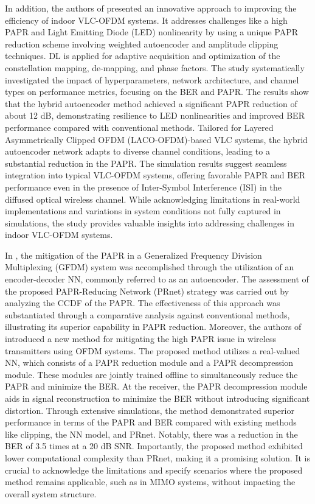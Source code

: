\documentclass[conference]{IEEEtran}
\begin{document}
In addition, the authors of \cite{b143} presented an innovative approach to improving the efficiency of indoor VLC-OFDM systems. It addresses challenges like a high PAPR and Light Emitting Diode (LED) nonlinearity by using a unique PAPR reduction scheme involving weighted autoencoder and amplitude clipping techniques. DL is applied for adaptive acquisition and optimization of the constellation mapping, de-mapping, and phase factors. The study systematically investigated the impact of hyperparameters, network architecture, and channel types on performance metrics, focusing on the BER and PAPR. The results show that the hybrid autoencoder method achieved a significant PAPR reduction of about 12 dB, demonstrating resilience to LED nonlinearities and improved BER performance compared with conventional methods. Tailored for Layered Asymmetrically Clipped OFDM (LACO-OFDM)-based VLC systems, the hybrid autoencoder network adapts to diverse channel conditions, leading to a substantial reduction in the PAPR. The simulation results suggest seamless integration into typical VLC-OFDM systems, offering favorable PAPR and BER performance even in the presence of Inter-Symbol Interference (ISI) in the diffused optical wireless channel. While acknowledging limitations in real-world implementations and variations in system conditions not fully captured in simulations, the study provides valuable insights into addressing challenges in indoor VLC-OFDM systems.

In \cite{b144}, the mitigation of the PAPR in a Generalized Frequency Division Multiplexing (GFDM) system was accomplished through the utilization of an encoder-decoder NN, commonly referred to as an autoencoder. The assessment of the proposed PAPR-Reducing Network (PRnet) strategy was carried out by analyzing the CCDF of the PAPR. The effectiveness of this approach was substantiated through a comparative analysis against conventional methods, illustrating its superior capability in PAPR reduction. Moreover, the authors of \cite{b145} introduced a new method for mitigating the high PAPR issue in wireless transmitters using OFDM systems. The proposed method utilizes a real-valued NN, which consists of a PAPR reduction module and a PAPR decompression module. These modules are jointly trained offline to simultaneously reduce the PAPR and minimize the BER. At the receiver, the PAPR decompression module aids in signal reconstruction to minimize the BER without introducing significant distortion. Through extensive simulations, the method demonstrated superior performance in terms of the PAPR and BER compared with existing methods like clipping, the NN model, and PRnet. Notably, there was a reduction in the BER of 3.5 times at a 20 dB SNR. Importantly, the proposed method exhibited lower computational complexity than PRnet, making it a promising solution. It is crucial to acknowledge the limitations and specify scenarios where the proposed method remains applicable, such as in MIMO systems, without impacting the overall system structure.
\end{document}
